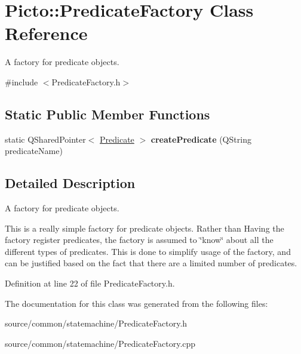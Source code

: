 \hypertarget{class_picto_1_1_predicate_factory}{\section{Picto\-:\-:Predicate\-Factory Class Reference}
\label{class_picto_1_1_predicate_factory}
}


A factory for predicate objects.  




{\ttfamily \#include $<$Predicate\-Factory.\-h$>$}

\subsection*{Static Public Member Functions}
\begin{DoxyCompactItemize}
\item 
\hypertarget{class_picto_1_1_predicate_factory_acf1098f94b4ff3cf43145f161f9bf52b}{static Q\-Shared\-Pointer$<$ \hyperlink{class_picto_1_1_predicate}{Predicate} $>$ {\bfseries create\-Predicate} (Q\-String predicate\-Name)}\label{class_picto_1_1_predicate_factory_acf1098f94b4ff3cf43145f161f9bf52b}

\end{DoxyCompactItemize}


\subsection{Detailed Description}
A factory for predicate objects. 

This is a really simple factory for predicate objects. Rather than Having the factory register predicates, the factory is assumed to \char`\"{}know\char`\"{} about all the different types of predicates. This is done to simplify usage of the factory, and can be justified based on the fact that there are a limited number of predicates. 

Definition at line 22 of file Predicate\-Factory.\-h.



The documentation for this class was generated from the following files\-:\begin{DoxyCompactItemize}
\item 
source/common/statemachine/Predicate\-Factory.\-h\item 
source/common/statemachine/Predicate\-Factory.\-cpp\end{DoxyCompactItemize}
